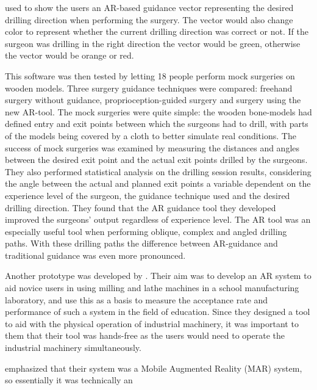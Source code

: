 used to show the users an AR-based guidance vector representing the desired 
drilling direction when performing the surgery. The vector would also change 
color to represent whether the current drilling direction was correct or not. 
If the surgeon was drilling in the right direction the vector would be green, 
otherwise the vector would be orange or red.\cite{VanGestel2024}\par
	This software was then tested by letting 18 people perform mock 
surgeries on wooden models.\cite{VanGestel2024} Three surgery guidance 
techniques were compared: freehand surgery without guidance, 
proprioception-guided surgery and surgery using the new 
AR-tool.\cite{VanGestel2024} The mock surgeries were quite simple: the wooden 
bone-models had defined entry and exit points between which the surgeons had 
to drill, with parts of the models being covered by a cloth to better 
simulate real conditions.\cite{VanGestel2024} The success of mock surgeries 
was examined by measuring the distances and angles between the desired exit 
point and the actual exit points drilled by the surgeons.\cite{VanGestel2024} 
They also performed statistical analysis on the drilling session results, 
considering the angle between the actual and planned exit points a variable 
dependent on the experience level of the surgeon, the guidance technique used 
and the desired drilling direction.\cite{VanGestel2024} They found that the 
AR guidance tool they developed improved the surgeons' output regardless of 
experience level.\cite{VanGestel2024} The AR tool was an especially useful 
tool when performing oblique, complex and angled drilling paths. With these 
drilling paths the difference between AR-guidance and traditional guidance was 
even more pronounced.\cite{VanGestel2024}\par
	Another prototype was developed by \textcite{reyesEtAl2016}. Their aim 
was to develop an AR system to aid novice users in using milling and lathe 
machines in a school manufacturing laboratory, and use this as a basis to 
measure the acceptance rate and performance of such a system in the field of 
education.\cite{reyesEtAl2016} Since they designed a tool to aid with the 
physical operation of industrial machinery, it was important to them that their 
tool was hands-free as the users would need to operate the industrial 
machinery simultaneously.\cite{reyesEtAl2016}\par
	\textcite{reyesEtAl2016} emphasized that their system was a Mobile 
Augmented Reality (MAR) system, so essentially it was technically an 
